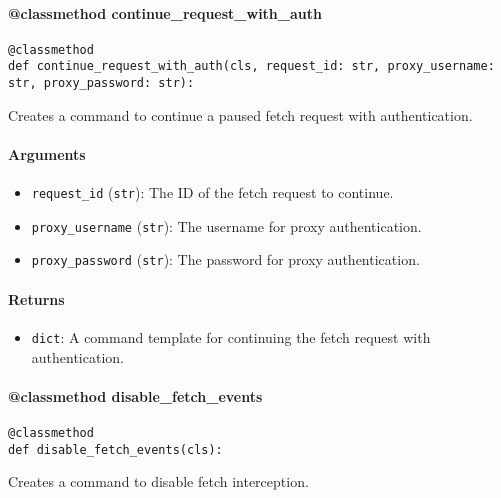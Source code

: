 \documentclass{article}
\begin{document}
\paragraph{@classmethod continue\_request\_with\_auth}

\begin{lstlisting}[style=pythonstyle]
@classmethod
def continue_request_with_auth(cls, request_id: str, proxy_username: str, proxy_password: str):
\end{lstlisting}

\noindent Creates a command to continue a paused fetch request with authentication.

\paragraph{Arguments}

\begin{itemize}
    \item \lstinline[style=pythonstyle]|request_id| (\lstinline[style=pythonstyle]|str|): The ID of the fetch request to continue.
    \item \lstinline[style=pythonstyle]|proxy_username| (\lstinline[style=pythonstyle]|str|): The username for proxy authentication.
    \item \lstinline[style=pythonstyle]|proxy_password| (\lstinline[style=pythonstyle]|str|): The password for proxy authentication.
\end{itemize}

\paragraph{Returns}

\begin{itemize}
    \item \lstinline[style=pythonstyle]|dict|: A command template for continuing the fetch request with authentication.
\end{itemize}

\paragraph{@classmethod disable\_fetch\_events}

\begin{lstlisting}[style=pythonstyle]
@classmethod
def disable_fetch_events(cls):
\end{lstlisting}

\noindent Creates a command to disable fetch interception.
\end{document}
